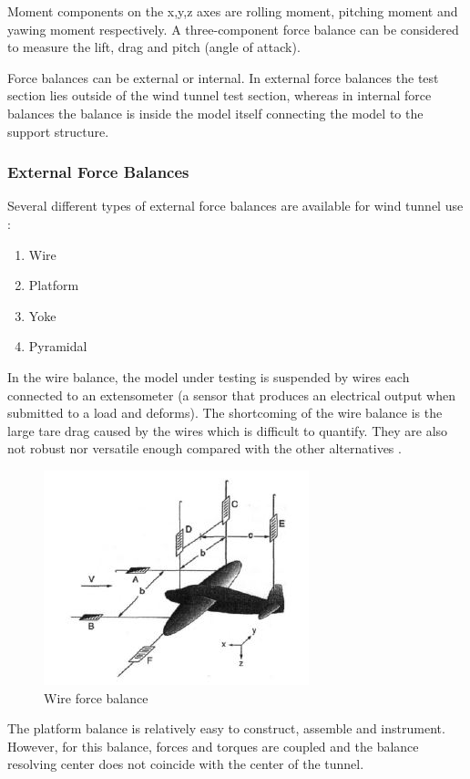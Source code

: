 Moment components on the x,y,z axes are rolling moment, pitching moment and yawing moment respectively. A three-component force balance can be considered to measure the lift, drag and pitch (angle of attack).

Force balances can be external or internal. In external force balances the test section lies outside of the wind tunnel test section, whereas in internal force balances the balance is inside the model itself connecting the model to the support structure.
\subsubsection{External Force Balances}
Several different types of external force balances are available for wind tunnel use
\cite{morris_force_2010}:
\begin{enumerate}
	\item Wire
	\item Platform
	\item Yoke
	\item Pyramidal
\end{enumerate}
In the wire balance, the model under testing is suspended by wires each connected to an extensometer (a sensor that produces an electrical output when submitted to a load and deforms). The shortcoming of the wire balance is the large tare drag caused by the wires which is difficult to quantify. They are also not robust nor versatile enough compared with the other alternatives \cite{ferreira2015design}.
\begin{center}
	\begin{figure}[H]
		\centering
		\includegraphics{Figures/Wire}
		\caption[Wire force balance]{Wire force balance \cite{ferreira2015design}}
	\end{figure}
\end{center}
The platform balance is relatively easy to construct, assemble and instrument. However, for this balance, forces and torques are coupled and the balance resolving center does not coincide with the center of the tunnel.
